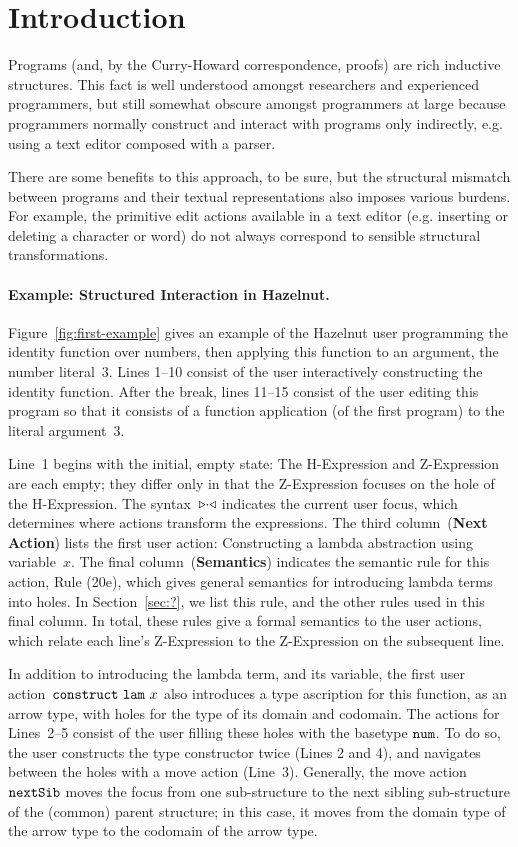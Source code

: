 \documentclass{llncs}
\begin{document}
\section{Introduction}
%
Programs (and, by the Curry-Howard correspondence, proofs) are rich inductive structures. This fact is well understood amongst researchers and experienced programmers, but still somewhat  obscure amongst programmers at large because programmers normally construct and interact with  programs only indirectly, e.g. using a text editor composed with a parser.

There are some benefits to this approach, to be sure, but the structural mismatch between programs and their textual representations  also imposes various burdens.
For example, the primitive edit actions available in a text editor (e.g. inserting or deleting a character or word)  do not always correspond to  sensible structural transformations.


\paragraph{Example: Structured Interaction in Hazelnut.}
%
Figure~\ref{fig:first-example} gives an example of the Hazelnut user
programming the identity function over numbers, then applying this
function to an argument, the number literal~3.
%
Lines 1--10 consist of the user interactively constructing the
identity function.
%
After the break, lines 11--15 consist of the user editing this program
so that it consists of a function application (of the first program)
to the literal argument~3.

Line~1 begins with the initial, empty state: The H-Expression and
Z-Expression are each empty; they differ only in that the Z-Expression
focuses on the hole of the H-Expression.
%
The syntax~${\triangleright}{\cdot}{\triangleleft}$ indicates the current user focus, which
determines where actions transform the expressions.
%
The third column~(\textbf{Next Action}) lists the first user action:
Constructing a lambda abstraction using variable~$x$.
%
The final column~(\textbf{Semantics}) indicates the semantic rule for
this action, Rule (20e), which gives general semantics for introducing
lambda terms into holes.
%
In Section~\ref{sec:?}, we list this rule, and the other rules used in
this final column. In total, these rules give a formal semantics to
the user actions, which relate each line's Z-Expression to the
Z-Expression on the subsequent line.

In addition to introducing the lambda term, and its variable, the
first user action~$\mathtt{construct}~\mathtt{lam}~x$ also introduces a type
ascription for this function, as an arrow type, with holes for the
type of its domain and codomain.
%
The actions for Lines~2--5 consist of the user filling these holes
with the basetype $\texttt{num}{}$.
%
To do so, the user constructs the type constructor twice (Lines 2 and
4), and navigates between the holes with a move action (Line~3).
%
Generally, the move action~$\mathtt{nextSib}$ moves the focus from one
sub-structure to the next sibling sub-structure of the (common) parent
structure; in this case, it moves from the domain type of the arrow
type to the codomain of the arrow type.
%
\end{document}
